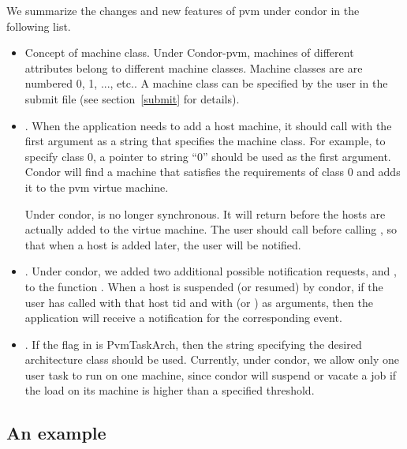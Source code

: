 We summarize the changes and new features of pvm under condor in the
following list.
\begin{itemize}

\item Concept of machine class.  Under Condor-pvm, machines of
  different attributes belong to different machine classes.  Machine
  classes are are numbered 0, 1, ..., etc..  A machine class can be
  specified by the user in the submit file (see section~\ref{submit}
  for details).

\item {}.  When the application
  needs to add a host machine, it should call 
  with the first argument as a string that specifies the machine
  class.  For example, to specify class 0, a pointer to string ``0''
  should be used as the first argument.  Condor will find a machine
  that satisfies the requirements of class 0 and adds it to the pvm
  virtue machine.

  Under condor,  is no longer synchronous.  It
  will return before the hosts are actually added to the virtue
  machine.  The user should call  before calling
  , so that when a host is added later, the user
  will be notified.
	
\item {}.  Under condor, we added two additional 
  possible notification requests,  and
  , to the function .  When a
  host is suspended (or resumed) by condor, if the user has called
   with that host tid and with
   (or ) as arguments, then
  the application will receive a notification for the corresponding
  event.

\item {}.  If  the flag in  is 
  PvmTaskArch, then the string specifying the desired architecture
  class should be used.  Currently, under condor, we allow only one
  user task to run on one machine, since condor will suspend or vacate
  a job if the load on its machine is higher than a specified
  threshold.

\end{itemize}

\subsection{An example}

